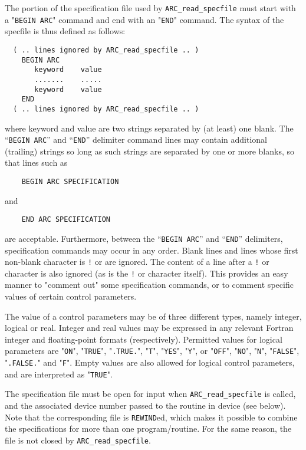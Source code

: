 \documentclass{galahad}
\newcommand{\packagename}{ARC}
\begin{document}
The portion of the specification file used by
{\tt \packagename\_read\_specfile}
must start
with a "{\tt BEGIN \packagename}" command and end with an
"{\tt END}" command.  The syntax of the specfile is thus defined as follows:
\begin{verbatim}
  ( .. lines ignored by ARC_read_specfile .. )
    BEGIN ARC
       keyword    value
       .......    .....
       keyword    value
    END
  ( .. lines ignored by ARC_read_specfile .. )
\end{verbatim}
where keyword and value are two strings separated by (at least) one blank.
The ``{\tt BEGIN \packagename}'' and ``{\tt END}'' delimiter command lines
may contain additional (trailing) strings so long as such strings are
separated by one or more blanks, so that lines such as
\begin{verbatim}
    BEGIN ARC SPECIFICATION
\end{verbatim}
and
\begin{verbatim}
    END ARC SPECIFICATION
\end{verbatim}
are acceptable. Furthermore,
between the
``{\tt BEGIN \packagename}'' and ``{\tt END}'' delimiters,
specification commands may occur in any order.  Blank lines and
lines whose first non-blank character is {\tt !} or {\tt *} are ignored.
The content
of a line after a {\tt !} or {\tt *} character is also
ignored (as is the {\tt !} or {\tt *}
character itself). This provides an easy manner to "comment out" some
specification commands, or to comment specific values
of certain control parameters.

The value of a control parameters may be of three different types, namely
integer, logical or real.
Integer and real values may be expressed in any relevant Fortran integer and
floating-point formats (respectively). Permitted values for logical
parameters are "{\tt ON}", "{\tt TRUE}", "{\tt .TRUE.}", "{\tt T}",
"{\tt YES}", "{\tt Y}", or "{\tt OFF}", "{\tt NO}",
"{\tt N}", "{\tt FALSE}", "{\tt .FALSE.}" and "{\tt F}".
Empty values are also allowed for
logical control parameters, and are interpreted as "{\tt TRUE}".

The specification file must be open for
input when {\tt \packagename\_read\_specfile}
is called, and the associated device number
passed to the routine in device (see below).
Note that the corresponding
file is {\tt REWIND}ed, which makes it possible to combine the specifications
for more than one program/routine.  For the same reason, the file is not
closed by {\tt \packagename\_read\_specfile}.
\end{document}
